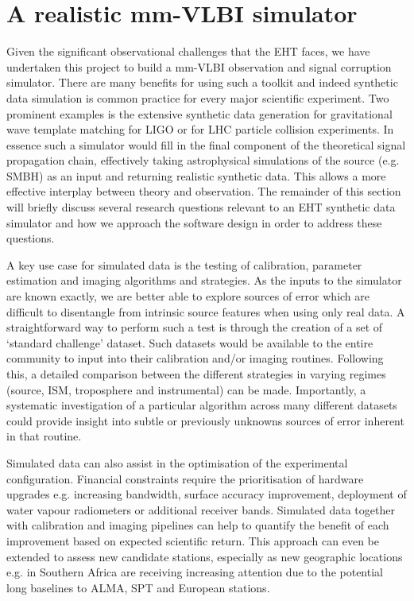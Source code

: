 \section{A realistic mm-VLBI simulator}

Given the significant observational challenges that the EHT faces, we have undertaken this project to build a mm-VLBI observation and signal corruption simulator. There are many benefits for using such a toolkit and indeed synthetic data simulation is common practice for every major scientific experiment. Two prominent examples is the extensive synthetic data generation for gravitational wave template matching for LIGO or for LHC particle collision experiments. In essence such a simulator would fill in the final component of the theoretical signal propagation chain, effectively taking astrophysical simulations of the source (e.g. SMBH) as an input and returning realistic synthetic data. This allows a more effective interplay between theory and observation. The remainder of this section will briefly discuss several research questions relevant to an EHT synthetic data simulator and how we approach the software design in order to address these questions. 


A key use case for simulated data is the testing of calibration, parameter estimation and imaging algorithms and strategies. As the inputs to the simulator are known exactly, we are better able to explore sources of error which are difficult to disentangle from intrinsic source features when using only real data. A straightforward way to perform such a test is through the creation of a set of `standard challenge' dataset. Such datasets would be available to the entire community to input into their calibration and/or imaging routines. Following this, a detailed comparison between the different strategies in varying regimes (source, ISM, troposphere and instrumental) can be made. Importantly, a systematic investigation of a particular algorithm across many different datasets could provide insight into subtle or previously unknowns sources of error inherent in that routine.


Simulated data can also assist in the optimisation of the experimental configuration. Financial constraints require the prioritisation of hardware upgrades e.g. increasing bandwidth, surface accuracy improvement, deployment of water vapour radiometers or additional receiver bands. Simulated data together with calibration and imaging pipelines can help to quantify the benefit of each improvement based on expected scientific return. This approach can even be extended to assess new candidate stations, especially as new geographic locations e.g. in Southern Africa are receiving increasing attention due to the potential long baselines to ALMA, SPT and European stations.


